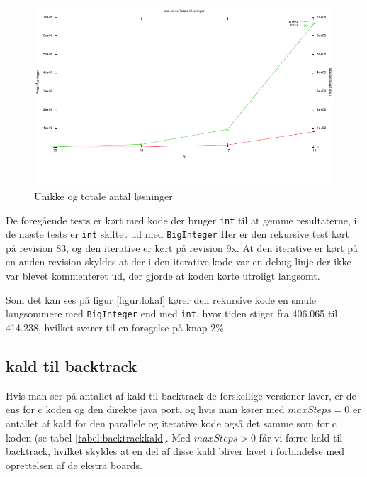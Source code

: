 \begin{figure}[h]
\begin{center}
\includegraphics{../benchmarks/unikkevstotale.pdf}
\caption{Unikke og totale antal løsninger} 
\label{figur:unikkevstotale}
\end{center}
\end{figure}

De foregående tests er kørt med kode der bruger \texttt{int} til at gemme resultaterne,
i de næste tests er \texttt{int} skiftet ud med \texttt{BigInteger} 
Her er den rekursive test kørt på revision 83, og den iterative er kørt på
revision 9x. At den iterative er kørt på en anden revision skyldes at der i den
iterative kode var en debug linje der ikke var blevet kommenteret ud, der gjorde
at koden kørte utroligt langsomt.

Som det kan ses på figur \ref{figur:lokal} kører den rekursive kode en smule
langsommere med \texttt{BigInteger} end med \texttt{int}, hvor tiden stiger fra
406.065 til 414.238, hvilket svarer til en forøgelse
på knap 2\% 


\subsection{kald til backtrack}

Hvis man ser på antallet af kald til backtrack de forskellige versioner laver,
er de ens for c koden og den direkte java port, og hvis man kører med
$maxSteps=0$ er antallet af kald for den parallele og iterative kode også det
samme som for c koden (se tabel \ref{tabel:backtrackkald}. Med $maxSteps>0$ får
vi færre kald til backtrack, hvilket skyldes at en del af disse kald bliver
lavet i forbindelse med oprettelsen af de ekstra boards. 

